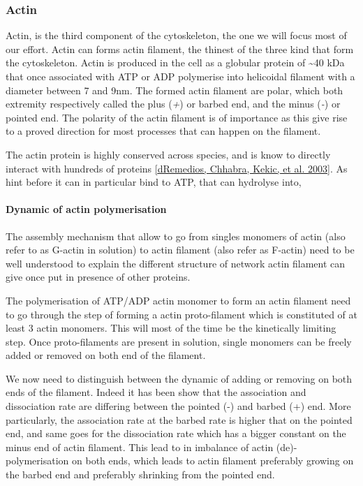 \documentclass[A4paperpaper,11pt,english]{sphinxmanual}
\begin{document}
\subsubsection{Actin}
\label{parts/part1:actin}
Actin, is the third component of the cytoskeleton, the one we will focus most
of our effort. Actin can forms actin filament, the thinest of the three kind
that form the cytoskeleton. Actin is produced in the cell as a globular protein
of \textasciitilde{}40 kDa that once associated with ATP or ADP polymerise into helicoidal
filament with a diameter between 7 and 9nm. The formed actin filament are
polar, which both extremity respectively called the plus (\emph{+}) or
barbed end, and the minus (\emph{-}) or pointed end. The polarity of the actin
filament is of importance as this give rise to a proved direction for most
processes that can happen on the filament.

The actin protein is highly conserved across species, and is know to directly
interact with hundreds of proteins {\hyperref[bibitem:dosremedios2003]{{[}dRemedios, Chhabra, Kekic,  et al.  2003{]}}}. As hint before it can in particular bind to ATP, that can hydrolyse into,


\paragraph{Dynamic of actin polymerisation}
\label{parts/part1:dynamic-of-actin-polymerisation}
The assembly mechanism that allow to go from singles monomers of actin (also
refer to as G-actin in solution) to actin filament (also refer as F-actin)
need to be well understood to explain the different structure of network actin
filament can give once put in presence of other proteins.

The polymerisation of ATP/ADP actin monomer to form an actin filament need to go
through the step of forming a actin proto-filament which is constituted of at
least 3 actin monomers. This will most of the time be the kinetically limiting
step. Once proto-filaments are present in solution, single monomers can be
freely added or removed on both end of the filament.

We now need to distinguish between the dynamic of adding or removing on both
ends of the filament. Indeed it has been show that the association and
dissociation rate are differing between the pointed (-) and barbed (+) end.
More particularly, the association rate at the barbed rate is higher that on
the pointed end, and same goes for the dissociation rate which has a bigger
constant on the minus end of actin filament. This lead to in imbalance of actin
(de)-polymerisation on both ends, which leads to actin filament preferably
growing on the barbed end and preferably shrinking from the pointed end.
\end{document}
